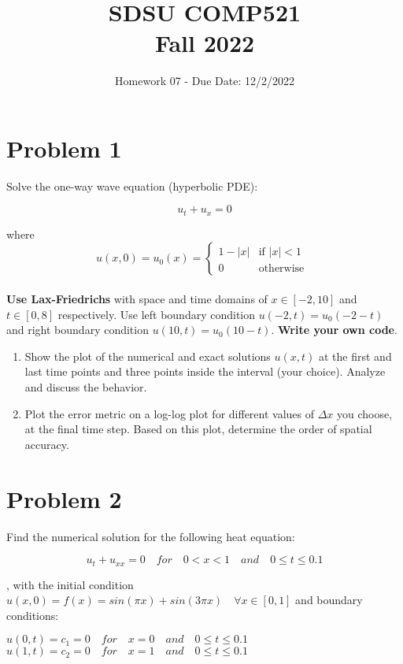 \documentclass{article}
\title{SDSU COMP521 \\ Fall 2022}
\author{Homework 07 - Due Date: 12/2/2022}
\date{}
\begin{document}
\newcommand{\norm}[1]{\left\lVert#1\right\rVert}
\maketitle

\section*{Problem 1}
Solve the one-way wave equation (hyperbolic PDE):

\begin{equation*}
u_t + u_x = 0
\end{equation*}

where \\


\begin{equation}
u(x,0)=u_0(x) =
\begin{cases}
1 -|x|& \text{if $|x| < 1$ }\\
0 & \text{otherwise}
\end{cases}
\end{equation}\\


\textbf{Use Lax-Friedrichs} with space and time domains of $x \in [-2,10]$ and $t \in [0,8]$ respectively. Use left boundary condition $u(-2,t)=u_0 (-2-t)$ and right boundary condition $u(10,t)=u_0 (10-t)$. \textbf{Write your own code}.

\begin{enumerate}
	\item Show the plot of the numerical and exact solutions $u(x,t)$ at the first and last time points and three points inside the interval (your choice). Analyze and discuss the behavior.
	\item Plot the error metric on a log-log plot for different values of $\Delta x$ you choose, at the final time step. Based on this plot, determine the order of spatial accuracy.
\end{enumerate}

\section*{Problem 2 }
Find the numerical solution for the following heat equation:

\begin{equation*}
u_t + u_{xx} = 0 \quad  for \quad 0<x<1 \quad and \quad 0 \le t \le 0.1
\end{equation*}

, with the initial condition  $u(x,0)= f(x)= sin(\pi x)+ sin(3\pi x) \quad  \forall x \in [0,1]$ and boundary conditions:
\begin{center}
    $ u(0,t) = c_1 = 0 \quad for \quad x=0 \quad and \quad 0\le t \le 0.1 $ \\
    $ u(1,t) = c_2 = 0 \quad for \quad x=1 \quad and \quad 0\le t \le 0.1 $ 
\end{center}
\end{document}
